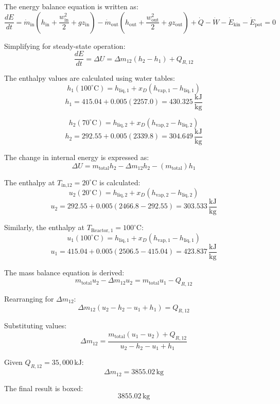 The energy balance equation is written as:  
\[
\frac{dE}{dt} = \dot{m}_{\text{in}} \left( h_{\text{in}} + \frac{w^2_{\text{in}}}{2} + gz_{\text{in}} \right) - \dot{m}_{\text{out}} \left( h_{\text{out}} + \frac{w^2_{\text{out}}}{2} + gz_{\text{out}} \right) + \dot{Q} - \dot{W} - \dot{E}_{\text{kin}} - \dot{E}_{\text{pot}} = 0
\]

Simplifying for steady-state operation:  
\[
\frac{dE}{dt} = \Delta U = \Delta m_{12} (h_2 - h_1) + Q_{R,12}
\]

The enthalpy values are calculated using water tables:  
\[
h_1 (100^\circ\text{C}) = h_{\text{liq},1} + x_D (h_{\text{vap},1} - h_{\text{liq},1})
\]
\[
h_1 = 415.04 + 0.005 (2257.0) = 430.325 \, \frac{\text{kJ}}{\text{kg}}
\]

\[
h_2 (70^\circ\text{C}) = h_{\text{liq},2} + x_D (h_{\text{vap},2} - h_{\text{liq},2})
\]
\[
h_2 = 292.55 + 0.005 (2339.8) = 304.649 \, \frac{\text{kJ}}{\text{kg}}
\]

The change in internal energy is expressed as:  
\[
\Delta U = m_{\text{total}} h_2 - \Delta m_{12} h_2 - (m_{\text{total}}) h_1
\]

The enthalpy at \( T_{\text{in,12}} = 20^\circ\text{C} \) is calculated:  
\[
u_2 (20^\circ\text{C}) = h_{\text{liq},2} + x_D (h_{\text{vap},2} - h_{\text{liq},2})
\]
\[
u_2 = 292.55 + 0.005 (2466.8 - 292.55) = 303.533 \, \frac{\text{kJ}}{\text{kg}}
\]

Similarly, the enthalpy at \( T_{\text{Reactor},1} = 100^\circ\text{C} \):  
\[
u_1 (100^\circ\text{C}) = h_{\text{liq},1} + x_D (h_{\text{vap},1} - h_{\text{liq},1})
\]
\[
u_1 = 415.04 + 0.005 (2506.5 - 415.04) = 423.837 \, \frac{\text{kJ}}{\text{kg}}
\]

The mass balance equation is derived:  
\[
m_{\text{total}} u_2 - \Delta m_{12} u_2 = m_{\text{total}} u_1 - Q_{R,12}
\]

Rearranging for \( \Delta m_{12} \):  
\[
\Delta m_{12} (u_2 - h_2 - u_1 + h_1) = Q_{R,12}
\]

Substituting values:  
\[
\Delta m_{12} = \frac{m_{\text{total}} (u_1 - u_2) + Q_{R,12}}{u_2 - h_2 - u_1 + h_1}
\]

Given \( Q_{R,12} = 35,000 \, \text{kJ} \):  
\[
\Delta m_{12} = 3855.02 \, \text{kg}
\]

The final result is boxed:  
\[
\boxed{3855.02 \, \text{kg}}
\]